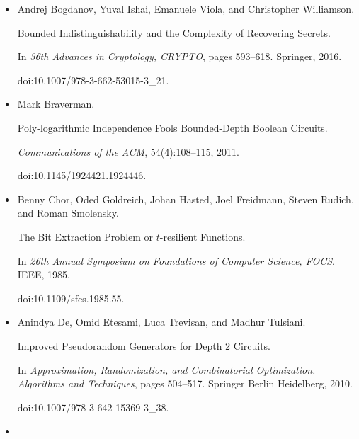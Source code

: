 \documentclass[10pt,a4paper]{article}
\begin{document}
\begin{itemize}
doi:10.4230/LIPIcs.ITCS.2022.26.





\item[] 
[6]

Andrej Bogdanov, Yuval Ishai, Emanuele Viola, and Christopher Williamson.


Bounded Indistinguishability and the Complexity of Recovering
Secrets.


In \emph{36th Advances in Cryptology, CRYPTO}, pages 593–618.
Springer, 2016.


doi:10.1007/978-3-662-53015-3\_21.





\item[] 
[7]

Mark Braverman.


Poly-logarithmic Independence Fools Bounded-Depth Boolean Circuits.


\emph{Communications of the ACM}, 54(4):108–115, 2011.


doi:10.1145/1924421.1924446.





\item[] 
[8]

Benny Chor, Oded Goldreich, Johan Hasted, Joel Freidmann, Steven Rudich, and
Roman Smolensky.


The Bit Extraction Problem or $t$-resilient Functions.


In \emph{26th Annual Symposium on Foundations of Computer Science,
FOCS}. IEEE, 1985.


doi:10.1109/sfcs.1985.55.





\item[] 
[9]

Anindya De, Omid Etesami, Luca Trevisan, and Madhur Tulsiani.


Improved Pseudorandom Generators for Depth $2$ Circuits.


In \emph{Approximation, Randomization, and Combinatorial Optimization.
Algorithms and Techniques}, pages 504–517. Springer Berlin Heidelberg, 2010.


doi:10.1007/978-3-642-15369-3\_38.





\item[] 
[10]


\end{itemize}
\end{document}
